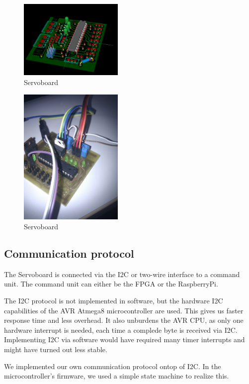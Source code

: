 \documentclass[12pt]{article}
\begin{document}
\begin{figure}[h]
\begin{center}
\includegraphics[width=5cm]{pic/servoboard3d.png}
\caption{Servoboard}
\end{center}
\label{figservoboard3d}
\end{figure}

\begin{figure}[h]
\begin{center}
\includegraphics[width=5cm]{pic/servoboardr.jpg}
\caption{Servoboard}
\end{center}
\label{figservoboardr}
\end{figure}

\subsection{Communication protocol}
The Servoboard is connected via the I2C or two-wire interface to a command unit.
The command unit can either be the FPGA or the RaspberryPi.


The I2C protocol is not implemented in software, but the hardware I2C capabilities of the AVR Atmega8 microcontroller are used.
This gives us faster response time and less overhead.
It also unburdens the AVR CPU, as only one hardware interrupt is needed, each time a complede byte is received via I2C.
Implementing I2C via software would have required many timer interrupts and might have turned out less stable.


We implemented our own communication protocol ontop of I2C.
In the microcontroller's firmware, we used a simple state machine to realize this.
\end{document}
